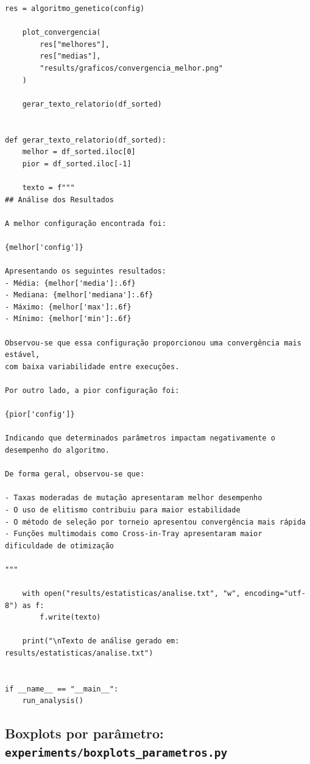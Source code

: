 \documentclass[a4paper,12pt]{article}
\begin{document}
\begin{lstlisting}[caption={experiments/analise\_final.py}]
    res = algoritmo_genetico(config)

    plot_convergencia(
        res["melhores"],
        res["medias"],
        "results/graficos/convergencia_melhor.png"
    )

    gerar_texto_relatorio(df_sorted)


def gerar_texto_relatorio(df_sorted):
    melhor = df_sorted.iloc[0]
    pior = df_sorted.iloc[-1]

    texto = f"""
## Análise dos Resultados

A melhor configuração encontrada foi:

{melhor['config']}

Apresentando os seguintes resultados:
- Média: {melhor['media']:.6f}
- Mediana: {melhor['mediana']:.6f}
- Máximo: {melhor['max']:.6f}
- Mínimo: {melhor['min']:.6f}

Observou-se que essa configuração proporcionou uma convergência mais estável,
com baixa variabilidade entre execuções.

Por outro lado, a pior configuração foi:

{pior['config']}

Indicando que determinados parâmetros impactam negativamente o desempenho do algoritmo.

De forma geral, observou-se que:

- Taxas moderadas de mutação apresentaram melhor desempenho
- O uso de elitismo contribuiu para maior estabilidade
- O método de seleção por torneio apresentou convergência mais rápida
- Funções multimodais como Cross-in-Tray apresentaram maior dificuldade de otimização

"""

    with open("results/estatisticas/analise.txt", "w", encoding="utf-8") as f:
        f.write(texto)

    print("\nTexto de análise gerado em: results/estatisticas/analise.txt")


if __name__ == "__main__":
    run_analysis()
\end{lstlisting}

\newpage
\subsection{Boxplots por parâmetro: \texttt{experiments/boxplots\_parametros.py}}
\end{document}
